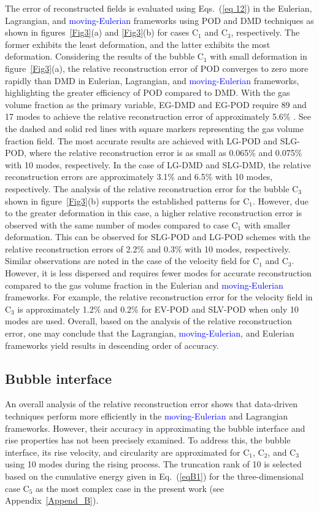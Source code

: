 \documentclass[a4paper,fleqn]{cas-sc}
\newcommand{\hl}[1]{\textcolor{blue}{#1}} %
\newcommand{\hl}[1]{#1} %
\begin{document}
	The error of reconstructed fields is evaluated using Eqs.~(\ref{eq 12}) in the Eulerian, Lagrangian, and \hl{moving-Eulerian} frameworks using POD and DMD techniques as shown in figures~\ref{Fig3}(a) and \ref{Fig3}(b) for cases C$_1$ and C$_3$, respectively. The former exhibits the least deformation, and the latter exhibits the most deformation. Considering the results of the bubble C$_1$ with small deformation in figure~\ref{Fig3}(a), the relative reconstruction error of POD converges to zero more rapidly than DMD in Eulerian, Lagrangian, and \hl{moving-Eulerian} frameworks, highlighting the greater efficiency of POD compared to DMD. With the gas volume fraction as the primary variable, EG-DMD and EG-POD require 89 and 17 modes to achieve the relative reconstruction error of approximately 5.6\% . See the dashed and solid red lines with square markers representing the gas volume fraction field. The most accurate results are achieved with LG-POD and SLG-POD, where the relative reconstruction error is as small as 0.065\% and 0.075\% with 10 modes, respectively. In the case of LG-DMD and SLG-DMD, the relative reconstruction errors are approximately 3.1\% and 6.5\% with 10 modes, respectively. The analysis of the relative reconstruction error for the bubble C$_3$ shown in figure~\ref{Fig3}(b) supports the established patterns for C$_1$. However, due to the greater deformation in this case, a higher relative reconstruction error is observed with the same number of modes compared to case C$_1$ with smaller deformation. This can be observed for SLG-POD and LG-POD schemes with the relative reconstruction errors of 2.2\% and 0.3\% with 10 modes, respectively. Similar observations are noted in the case of the velocity field for C$_1$ and C$_3$. However, it is less dispersed and requires fewer modes for accurate reconstruction compared to the gas volume fraction in the Eulerian and \hl{moving-Eulerian} frameworks. For example, the relative reconstruction error for the velocity field in C$_3$ is approximately 1.2\% and 0.2\% for EV-POD and SLV-POD when only 10 modes are used. Overall, based on the analysis of the relative reconstruction error, one may conclude that the Lagrangian, \hl{moving-Eulerian}, and Eulerian frameworks yield results in descending order of accuracy.
	
	\subsection{Bubble interface}
	\label{Bubble interface}
	An overall analysis of the relative reconstruction error shows that data-driven techniques perform more efficiently in the \hl{moving-Eulerian} and Lagrangian frameworks. However, their accuracy in approximating the bubble interface and rise properties has not been precisely examined. To address this, the bubble interface, its rise velocity, and circularity are approximated for C$_1$, C$_2$, and C$_3$ using 10 modes during the rising process. The truncation rank of 10 is selected based on the cumulative energy given in Eq.~(\ref{eqB1}) for the three-dimensional case C$_5$ as the most complex case in the present work (see Appendix~\ref{Append_B}). 
	
\end{document}
